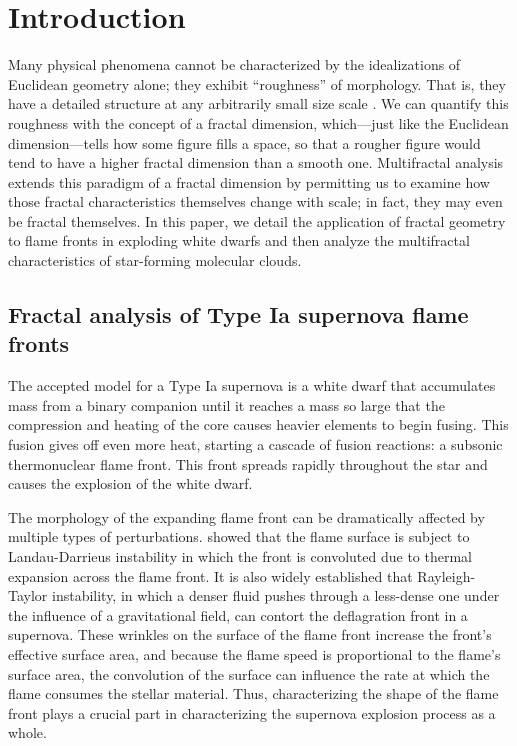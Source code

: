 \documentclass[iop]{emulateapj}
\begin{document}
\section{Introduction}
Many physical phenomena cannot be characterized by the idealizations of Euclidean geometry alone; they exhibit ``roughness'' of morphology. That is, they have a detailed structure at any arbitrarily small size scale \citep[see][]{Falconer2003}. We can quantify this roughness with the concept of a fractal dimension, which---just like the Euclidean dimension---tells how some figure fills a space, so that a rougher figure would tend to have a higher fractal dimension than a smooth one. Multifractal analysis extends this paradigm of a fractal dimension by permitting us to examine how those fractal characteristics themselves change with scale; in fact, they may even be fractal themselves. In this paper, we detail the application of fractal geometry to flame fronts in exploding white dwarfs and then analyze the multifractal characteristics of star-forming molecular clouds.

\subsection{Fractal analysis of Type Ia supernova flame fronts}
The accepted model for a Type Ia supernova is a white dwarf that accumulates mass from a binary companion until it reaches a mass so large that the compression and heating of the core causes heavier elements to begin fusing. This fusion gives off even more heat, starting a cascade of fusion reactions: a subsonic thermonuclear flame front. This front spreads rapidly throughout the star and causes the explosion of the white dwarf.

The morphology of the expanding flame front can be dramatically affected by multiple types of perturbations. \cite{Landau1959} showed that the flame surface is subject to Landau-Darrieus instability in which the front is convoluted due to thermal expansion across the flame front. It is also widely established \citep{Khokhlov} that Rayleigh-Taylor instability, in which a denser fluid pushes through a less-dense one under the influence of a gravitational field, can contort the deflagration front in a supernova. These wrinkles on the surface of the flame front increase the front's effective surface area, and because the flame speed is proportional to the flame's surface area, the convolution of the surface can influence the rate at which the flame consumes the stellar material. Thus, characterizing the shape of the flame front plays a crucial part in characterizing the supernova explosion process as a whole.
\end{document}

